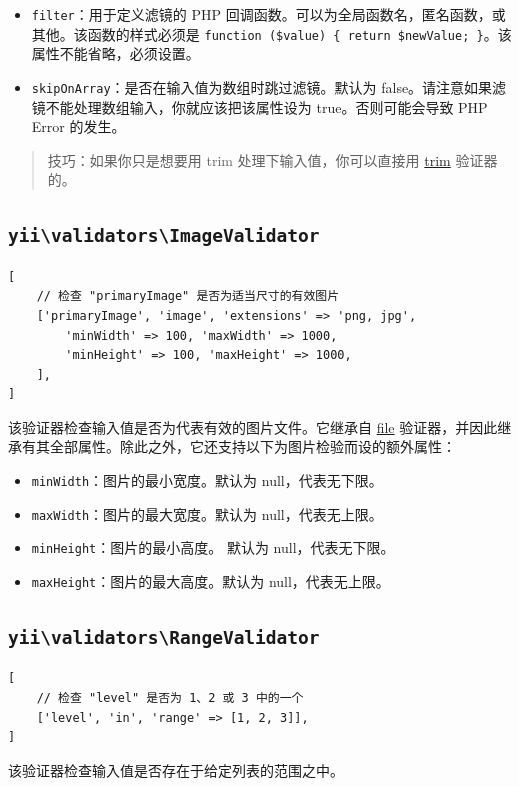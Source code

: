 \begin{itemize}
\item \lstinline|filter|：用于定义滤镜的 PHP 回调函数。可以为全局函数名，匿名函数，或其他。该函数的样式必须是 \lstinline|function ($value) { return $newValue; }|。该属性不能省略，必须设置。
\item \lstinline|skipOnArray|：是否在输入值为数组时跳过滤镜。默认为 false。请注意如果滤镜不能处理数组输入，你就应该把该属性设为 true。否则可能会导致 PHP Error 的发生。
\end{itemize}
\begin{quote}技巧：如果你只是想要用 trim 处理下输入值，你可以直接用 \hyperref[tutorial-core-validators.md::::trim]{trim} 验证器的。

\end{quote}
\subsection{\texttt{yii{\allowbreak{}\textbackslash}validators{\allowbreak{}\textbackslash}ImageValidator} \label{tutorial-core-validators.md::image}}
\lstset{language=php}\begin{lstlisting}
[
    // 检查 "primaryImage" 是否为适当尺寸的有效图片
    ['primaryImage', 'image', 'extensions' => 'png, jpg',
        'minWidth' => 100, 'maxWidth' => 1000,
        'minHeight' => 100, 'maxHeight' => 1000,
    ],
]
\end{lstlisting}
该验证器检查输入值是否为代表有效的图片文件。它继承自 \hyperref[tutorial-core-validators.md::::file]{file} 验证器，并因此继承有其全部属性。除此之外，它还支持以下为图片检验而设的额外属性：

\begin{itemize}
\item \lstinline|minWidth|：图片的最小宽度。默认为 null，代表无下限。
\item \lstinline|maxWidth|：图片的最大宽度。默认为 null，代表无上限。
\item \lstinline|minHeight|：图片的最小高度。 默认为 null，代表无下限。
\item \lstinline|maxHeight|：图片的最大高度。默认为 null，代表无上限。
\end{itemize}
\subsection{\texttt{yii{\allowbreak{}\textbackslash}validators{\allowbreak{}\textbackslash}RangeValidator} \label{tutorial-core-validators.md::in}}
\lstset{language=php}\begin{lstlisting}
[
    // 检查 "level" 是否为 1、2 或 3 中的一个
    ['level', 'in', 'range' => [1, 2, 3]],
]
\end{lstlisting}
该验证器检查输入值是否存在于给定列表的范围之中。

